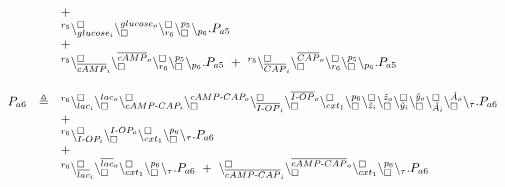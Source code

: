 {\[\begin{array}{lcl}
&& +\\
&& {}^{r_5}\backslash_{glucose_i}^{\scriptstyle {\square}}\backslash_{\scriptstyle {\square}}^{glucose_o} \backslash_{r_6}^{\scriptstyle {\square}}\backslash_{\scriptstyle {\square}}^{p_5}\backslash_{p_6}.P_{a5}\\
&& + \\
&&  {}^{r_5}\backslash_{\overline{cAMP}_i}^{\scriptstyle {\square}}\backslash_{\scriptstyle {\square}}^{\overline{cAMP}_o} \backslash_{r_6}^{\scriptstyle {\square}}\backslash_{\scriptstyle {\square}}^{p_5}\backslash_{p_6}.P_{a5} \ + \ {}^{r_5}\backslash_{\overline{CAP}_i}^{\scriptstyle {\square}}\backslash_{\scriptstyle {\square}}^{\overline{CAP}_o} \backslash_{r_6}^{\scriptstyle {\square}}\backslash_{\scriptstyle {\square}}^{p_5}\backslash_{p_6}.P_{a5}\\[5pt]
\\
P_{a6} & \triangleq& {}^{r_{6}}\backslash_{lac_i}^{\scriptstyle {\square}}\backslash_{\scriptstyle {\square}}^{lac_o}
\backslash_{cAMP\textrm{-}CAP_i}^{\scriptstyle {\square}}\backslash_{\scriptstyle {\square}}^{cAMP\textrm{-}CAP_o}\backslash_{\overline{I\textrm{-}OP}_i}^{\scriptstyle {\square}}
\backslash_{\scriptstyle {\square}}^{\overline{I\textrm{-}OP}_o}\backslash_{cxt_1}^{\scriptstyle {\square}}
\backslash_{\scriptstyle {\square}}^{p_6}
\backslash_{\tilde{z}_i}^{\scriptstyle {\square}}\backslash_{\scriptstyle {\square}}^{\tilde{z}_o}
\backslash_{\tilde{y}_i}^{\scriptstyle {\square}}\backslash_{\scriptstyle {\square}}^{\tilde{y}_o}
\backslash_{\tilde{A}_i}^{\scriptstyle {\square}}\backslash_{\scriptstyle {\square}}^{\tilde{A}_o}
\backslash_{\tau}.P_{a6}\\
&& +\\
&& {}^{r_{6}}\backslash_{I\textrm{-}OP_i}^{\scriptstyle {\square}}\backslash_{\scriptstyle {\square}}^{I\textrm{-}OP_o} \backslash_{cxt_1}^{\scriptstyle {\square}}\backslash_{\scriptstyle {\square}}^{p_6}\backslash_{\tau}.P_{a6} \\
&& + \\
&&  {}^{r_{6}}\backslash_{\overline{lac}_i}^{\scriptstyle {\square}}\backslash_{\scriptstyle {\square}}^{\overline{lac}_o} \backslash_{cxt_1}^{\scriptstyle {\square}}\backslash_{\scriptstyle {\square}}^{p_6}\backslash_{\tau}.P_{a6} \ + \ \backslash_{\overline{cAMP\textrm{-}CAP}_i}^{\scriptstyle {\square}}\backslash_{\scriptstyle {\square}}^{\overline{cAMP\textrm{-}CAP}_o} \backslash_{cxt_1}^{\scriptstyle {\square}}\backslash_{\scriptstyle {\square}}^{p_6}\backslash_{\tau}.P_{a6}
\end{array}
\]
}
